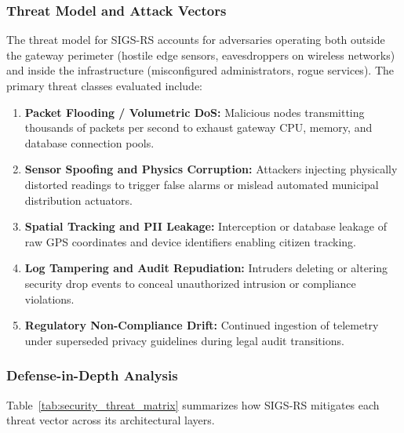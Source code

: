 \documentclass[a4paper]{article}
\begin{document}
\subsubsection{Threat Model and Attack Vectors}
The threat model for SIGS-RS accounts for adversaries operating both outside the gateway perimeter (hostile edge sensors, eavesdroppers on wireless networks) and inside the infrastructure (misconfigured administrators, rogue services). The primary threat classes evaluated include:
\begin{enumerate}[label=(\alph*)]
    \item \textbf{Packet Flooding / Volumetric DoS:} Malicious nodes transmitting thousands of packets per second to exhaust gateway CPU, memory, and database connection pools.
    \item \textbf{Sensor Spoofing and Physics Corruption:} Attackers injecting physically distorted readings to trigger false alarms or mislead automated municipal distribution actuators.
    \item \textbf{Spatial Tracking and PII Leakage:} Interception or database leakage of raw GPS coordinates and device identifiers enabling citizen tracking.
    \item \textbf{Log Tampering and Audit Repudiation:} Intruders deleting or altering security drop events to conceal unauthorized intrusion or compliance violations.
    \item \textbf{Regulatory Non-Compliance Drift:} Continued ingestion of telemetry under superseded privacy guidelines during legal audit transitions.
\end{enumerate}

\subsubsection{Defense-in-Depth Analysis}
Table~\ref{tab:security_threat_matrix} summarizes how SIGS-RS mitigates each threat vector across its architectural layers.
\end{document}
